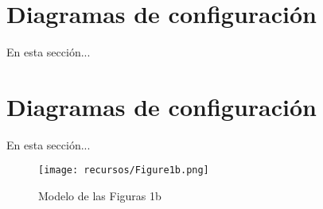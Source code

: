 \thispagestyle{empty}
\setcounter{figure}{0}

\section{Diagramas de configuración}
En esta sección...


\section{Diagramas de configuración}
En esta sección...
\begin{figure}[!htbp]
    \centering
    \texttt{[image: recursos/Figure1b.png]}
    \caption{Modelo de las Figuras 1b \cite{upm56279}}
    \label{fig:figura1aes}
\end{figure}